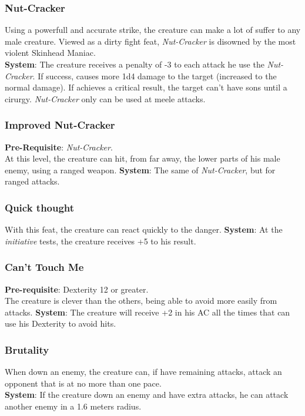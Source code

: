\documentclass[ letterpaper,12pt]{article}
\begin{document}
\subsubsection{Nut-Cracker}
Using a powerfull and accurate strike, the creature can make a lot of suffer to any male creature. Viewed as a dirty fight feat, {\it Nut-Cracker} is disowned by the most violent Skinhead Maniac.\\
{\bf System}: The creature receives a penalty of -3 to each attack he use the {\it Nut-Cracker}. If success, causes more 1d4 damage to the target (increased to the normal damage). If achieves a critical result, the target can't have sons until a cirurgy. {\it Nut-Cracker} only can be used at meele attacks.

\subsubsection{Improved Nut-Cracker}
{\bf Pre-Requisite}: {\it Nut-Cracker}.\\
At this level, the creature can hit, from far away, the lower parts of his male enemy, using a ranged weapon.
{\bf System}: The same of {\it Nut-Cracker}, but for ranged attacks.

\subsubsection{Quick thought}
With this feat, the creature can react quickly to the danger.
{\bf System}: At the {\it initiative} tests, the creature receives +5 to his result.

\subsubsection{Can't Touch Me}
{\bf Pre-requisite}: Dexterity 12 or greater.\\
The creature is clever than the others, being able to avoid more easily from attacks.
{\bf System}: The creature will receive +2 in his AC all the times that can use his Dexterity to avoid hits.

\subsubsection{Brutality}
When down an enemy, the creature can, if have remaining attacks, attack an opponent that is at no more than one pace.\\
{\bf System}: If the creature down an enemy and have extra attacks, he can attack another enemy in a 1.6 meters radius.
\end{document}

